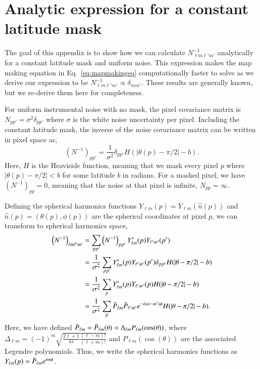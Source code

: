 \documentclass[twocolumn]{aa}
\begin{document}






\appendix

\section{Analytic expression for a constant latitude mask}
\label{sec:appendixA}


The goal of this appendix is to show how we can calculate $N_{\ell m \ell' m'}^{-1}$ analytically for a constant latitude mask and uniform noise. This expression makes the map making equation in Eq.~\eqref{eq:mapmakingeq} computationally faster to solve as we derive our expression to be $N_{\ell m \ell' m'}^{-1} \propto \delta_{mm'}$. These results are generally known, but we re-derive them here for completeness.

For uniform instrumental noise with no mask, the pixel covariance matrix is $N_{pp'} = \sigma^2 \delta_{pp'}$ where $\sigma$ is the white noise uncertainty per pixel. Including the constant latitude mask, the inverse of the noise covariance matrix can be written in pixel space as,
$$
\left(N^{-1} \right)_{pp'} = \frac{1}{\sigma^2} \delta_{pp'} H(|\theta(p) -\pi/2|-b).
$$
Here, $H$ is the Heaviside function, meaning that we mask every pixel $p$ where $|\theta(p) -\pi/2| < b$ for some latitude $b$ in radians. For a masked pixel, we have $\left(N^{-1} \right)_{pp}=0$, meaning that the noise at that pixel is infinite, $N_{pp} = \infty$.

Defining the spherical harmonics functions $Y_{\ell m}\left(p\right) = Y_{\ell m}\left(\hat{n}(p)\right)$ and $\hat{n}(p) = (\theta(p), \phi(p))$ are the spherical coordinates at pixel $p$, we can transform to spherical harmonics space,
\begin{align}
\nonumber
\left(N^{-1}\right)_{\ell m \ell' m'} &= \sum_{p p'}\left(N^{-1}\right)_{pp'}Y^{*}_{\ell m}(p)Y_{\ell' m'}(p')\\
\nonumber
&= \frac{1}{\sigma^2}\sum_{p p'} Y^{*}_{\ell m}(p)Y_{\ell' m'}(p') \delta_{pp'} H(|\theta -\pi/2|-b)\\
\nonumber
&= \frac{1}{\sigma^2}\sum_{p } Y^{*}_{\ell m}(p)Y_{\ell' m'}(p) H(|\theta -\pi/2|-b)\\
&= \frac{1}{\sigma^2}\sum_p \Tilde{P}_{\ell m}\Tilde{P}_{\ell' m'} e^{-i(m-m')\phi} H(|\theta -\pi/2|-b).
\end{align}
Here, we have defined $\Tilde{P}_{\ell m}=\Tilde{P}_{\ell m}(\theta) = \Delta_{\ell m}P_{\ell m}(\cos(\theta))$, where ${\Delta_{\ell m}=(-1)^m \sqrt{\frac{2\ell+1}{4\pi}\frac{(\ell - m)!}{(\ell+m)!}}}$ and $P_{\ell m}(\cos(\theta))$ are the associated Legendre polynomials. Thus, we write the spherical harmonics functions as $Y_{\ell m}(p) = \Tilde{P}_{\ell m} e^{im\phi}$.
\end{document}

